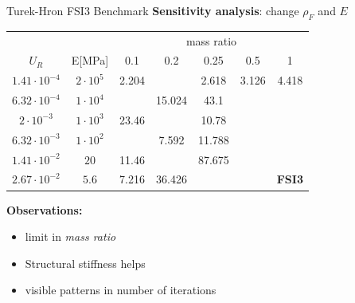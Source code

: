 \documentclass[10pt,t]{beamer}
\begin{document}
\begin{frame}{Turek-Hron FSI3 Benchmark}
\label{fsi2}
\textbf{Sensitivity analysis}: change $\rho_F$ and $E$ 


\footnotesize
\begin{center}
	\begin{tabular}{ c | c | c c c c c |} 
	&  & \multicolumn{5}{c|}{mass ratio} \\
		
	$U_R$ & E[\si{MPa}] & 0.1 & 0.2 & 0.25 & 0.5 & 1 \\
	\hline
    $1.41\cdot 10^{-4}$ & $2\cdot 10^{5}$ & \cellcolor{green!10}2.204 & \cellcolor{green!10} & \cellcolor{green!10}2.618 & \cellcolor{green!10}3.126 & \cellcolor{green!10}4.418 \\
	$6.32\cdot 10^{-4}$ & $1\cdot 10^{4}$ & \cellcolor{green!10} & \cellcolor{green!10}15.024 & \cellcolor{green!10}43.1 & \cellcolor{red!10} & \cellcolor{red!10} \\        
	$2\cdot 10^{-3}$ & $1\cdot 10^{3}$ & \cellcolor{green!10}23.46 & \cellcolor{green!10} & \cellcolor{green!10}10.78 & \cellcolor{red!10} & \cellcolor{red!10} \\
	$6.32\cdot 10^{-3}$ & $1\cdot 10^{2}$ & \cellcolor{green!10} & \cellcolor{green!10}7.592 & \cellcolor{green!10}11.788 & \cellcolor{red!10} & \cellcolor{red!10} \\
	$1.41\cdot 10^{-2}$ & $20$ & \cellcolor{green!10}11.46 & \cellcolor{green!10} & \cellcolor{green!10}87.675 & \cellcolor{red!10} & \cellcolor{red!10} \\
	$2.67\cdot 10^{-2}$ & $5.6$ & \cellcolor{green!10}7.216 & \cellcolor{green!10}36.426 & \cellcolor{red!10} & \cellcolor{red!10} & \cellcolor{red!10}\textbf{FSI3} \\
	\hline                        
	\end{tabular}
\end{center}

\vspace{0.5cm}

\normalsize

\textbf{Observations:}
\begin{itemize}
    \item limit in \textit{mass ratio}
    \item Structural stiffness helps
    \item visible patterns in number of iterations
\end{itemize}


\hyperlink{fsi1}{}

\end{frame}
\end{document}
